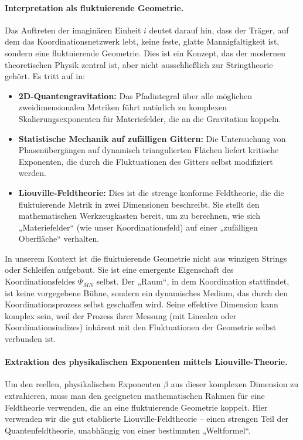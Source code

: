 \documentclass[12pt,a4paper]{article}
\theoremstyle{remark}
\begin{document}
	\paragraph{Interpretation als fluktuierende Geometrie.}
	Das Auftreten der imaginären Einheit \(i\) deutet darauf hin, dass der Träger, auf dem das Koordinationsnetzwerk lebt, keine feste, glatte Mannigfaltigkeit ist, sondern eine fluktuierende Geometrie. Dies ist ein Konzept, das der modernen theoretischen Physik zentral ist, aber nicht ausschließlich zur Stringtheorie gehört. Es tritt auf in:
	\begin{itemize}
		\item \textbf{2D-Quantengravitation:} Das Pfadintegral über alle möglichen zweidimensionalen Metriken führt natürlich zu komplexen Skalierungsexponenten für Materiefelder, die an die Gravitation koppeln.
		\item \textbf{Statistische Mechanik auf zufälligen Gittern:} Die Untersuchung von Phasenübergängen auf dynamisch triangulierten Flächen liefert kritische Exponenten, die durch die Fluktuationen des Gitters selbst modifiziert werden.
		\item \textbf{Liouville-Feldtheorie:} Dies ist die strenge konforme Feldtheorie, die die fluktuierende Metrik in zwei Dimensionen beschreibt. Sie stellt den mathematischen Werkzeugkasten bereit, um zu berechnen, wie sich „Materiefelder“ (wie unser Koordinationsfeld) auf einer „zufälligen Oberfläche“ verhalten.
	\end{itemize}
	In unserem Kontext ist die fluktuierende Geometrie nicht aus winzigen Strings oder Schleifen aufgebaut. Sie ist eine emergente Eigenschaft des Koordinationsfeldes \(\Psi_{MN}\) selbst. Der „Raum“, in dem Koordination stattfindet, ist keine vorgegebene Bühne, sondern ein dynamisches Medium, das durch den Koordinationsprozess selbst geschaffen wird. Seine effektive Dimension kann komplex sein, weil der Prozess ihrer Messung (mit Linealen oder Koordinationsindizes) inhärent mit den Fluktuationen der Geometrie selbst verbunden ist.
	
	\paragraph{Extraktion des physikalischen Exponenten mittels Liouville-Theorie.}
	Um den reellen, physikalischen Exponenten \(\beta\) aus dieser komplexen Dimension zu extrahieren, muss man den geeigneten mathematischen Rahmen für eine Feldtheorie verwenden, die an eine fluktuierende Geometrie koppelt. Hier verwenden wir die gut etablierte Liouville-Feldtheorie – einen strengen Teil der Quantenfeldtheorie, unabhängig von einer bestimmten „Weltformel“.
	
\end{document}
